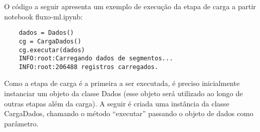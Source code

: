 O código a seguir apresenta um exemplo de execução da etapa de carga a partir notebook fluxo-ml.ipynb: 

\begin{lstlisting}
	dados = Dados()
	cg = CargaDados()
	cg.executar(dados)
	INFO:root:Carregando dados de segmentos...
	INFO:root:206488 registros carregados.
\end{lstlisting}

Como a etapa de carga é a primeira a ser executada, é preciso inicialmente instanciar um objeto da classe Dados (esse objeto será utilizado ao longo de outras etapas além da carga). A seguir é criada uma instância da classe CargaDados, chamando o método ``executar'' passando o objeto de dados como parâmetro.


